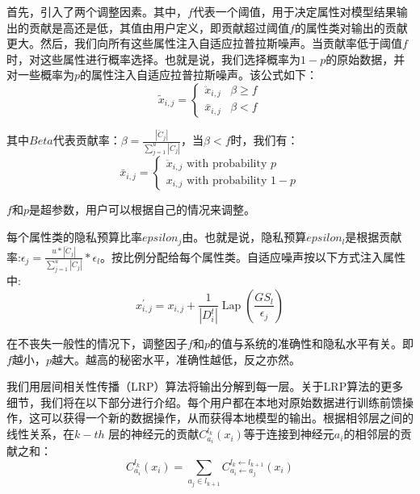 首先，引入了两个调整因素。其中，$f$代表一个阈值，用于决定属性对模型结果输出的贡献是高还是低，其值由用户定义，即贡献超过阈值$f$的属性类对输出的贡献更大。然后，我们向所有这些属性注入自适应拉普拉斯噪声。当贡献率低于阈值$f$时，对这些属性进行概率选择。也就是说，我们选择概率为$1-p$的原始数据，并对一些概率为$p$的属性注入自适应拉普拉斯噪声。该公式如下：
\begin{equation}\label{eq:神经网络加噪}
\tilde{x}_{i, j}=\left\{\begin{array}{ll}
\ddot{x}_{i, j} & \beta \geq f \\
\bar{x}_{i, j} & \beta<f
\end{array}\right.
\end{equation}

其中$Beta$代表贡献率：$\beta=\frac{\left|\ddot{C}_{j}\right|}{\sum_{j=1}^{u}\left|\ddot{C}_{j}\right|}$，当$\beta<f$时，我们有：
\begin{equation}\label{eq:神经网络加噪2}
\bar{x}_{i, j}=\left\{\begin{array}{l}
\ddot{x}_{i, j} \text { with probability } p \\
x_{i, j} \text { with probability } 1-p
\end{array}\right.
\end{equation}


$f$和$p$是超参数，用户可以根据自己的情况来调整。

每个属性类的隐私预算比率$epsilon_{j}$由。也就是说，隐私预算$epsilon_{l}$是根据贡献率:$\epsilon_{j}=\frac{u *\left|\ddot{C}_{j}\right|}{\sum_{j=1}^{u}\left|\ddot{C}_{j}\right|} * \epsilon_{l}$。按比例分配给每个属性类。自适应噪声按以下方式注入属性中:
\begin{equation}\label{eq:神经网络加噪3}
x_{i, j}^{\prime}=x_{i, j}+\frac{1}{\left|D_{i}^{t}\right|} \operatorname{Lap}\left(\frac{G S_{l}}{\epsilon_{j}}\right)
\end{equation}

在不丧失一般性的情况下，调整因子$f$和$p$的值与系统的准确性和隐私水平有关。即$f$越小，$p$越大。越高的秘密水平，准确性越低，反之亦然。

我们用层间相关性传播（LRP）算法将输出分解到每一层。关于LRP算法的更多细节，我们将在以下部分进行介绍。每个用户都在本地对原始数据进行训练前馈操作，这可以获得一个新的数据操作，从而获得本地模型的输出。根据相邻层之间的线性关系，在$k-t h$ 层的神经元的贡献$C_{a_{i}}^{l_{k}}\left(x_{i}\right)$等于连接到神经元$a_{i}$的相邻层的贡献之和：
\begin{equation}\label{eq:神经网络加噪4}
C_{a_{i}}^{l_{k}}\left(x_{i}\right)=\sum_{a_{j} \in l_{k+1}} C_{a_{i} \leftarrow a_{j}}^{l_{k} \leftarrow l_{k+1}}\left(x_{i}\right)
\end{equation}

